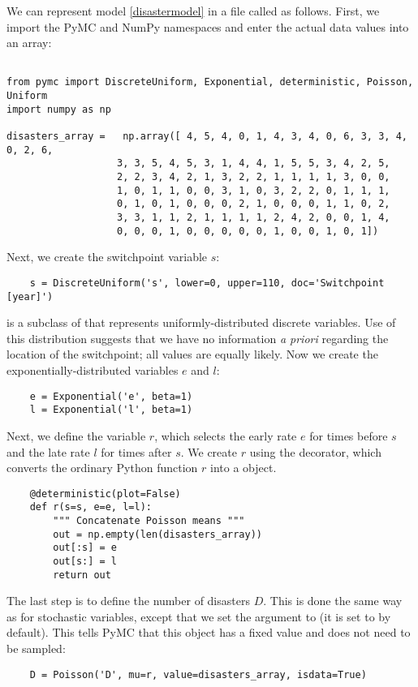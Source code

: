 We can represent model \ref{disastermodel} in a file called  as follows. First, we import the PyMC and NumPy namespaces and enter the actual data values into an array:
\begin{verbatim}
	
from pymc import DiscreteUniform, Exponential, deterministic, Poisson, Uniform
import numpy as np

disasters_array =   np.array([ 4, 5, 4, 0, 1, 4, 3, 4, 0, 6, 3, 3, 4, 0, 2, 6,
                   3, 3, 5, 4, 5, 3, 1, 4, 4, 1, 5, 5, 3, 4, 2, 5,
                   2, 2, 3, 4, 2, 1, 3, 2, 2, 1, 1, 1, 1, 3, 0, 0,
                   1, 0, 1, 1, 0, 0, 3, 1, 0, 3, 2, 2, 0, 1, 1, 1,
                   0, 1, 0, 1, 0, 0, 0, 2, 1, 0, 0, 0, 1, 1, 0, 2,
                   3, 3, 1, 1, 2, 1, 1, 1, 1, 2, 4, 2, 0, 0, 1, 4,
                   0, 0, 0, 1, 0, 0, 0, 0, 0, 1, 0, 0, 1, 0, 1])
\end{verbatim} 
Next, we create the switchpoint variable $s$:
\begin{verbatim}
	s = DiscreteUniform('s', lower=0, upper=110, doc='Switchpoint
[year]')  
\end{verbatim}
 is a subclass of  that represents uniformly-distributed discrete variables. Use of this distribution suggests that we have no information \emph{a priori} regarding the location of the switchpoint; all values are equally likely. Now we create the exponentially-distributed variables $e$ and $l$:
\begin{verbatim}
   	e = Exponential('e', beta=1)
	l = Exponential('l', beta=1)   
\end{verbatim}
Next, we define the variable $r$, which selects the early rate $e$ for times before $s$ and the late rate $l$ for times after $s$. We create $r$ using the  decorator, which converts the ordinary Python function $r$ into a  object.
\begin{verbatim}
	@deterministic(plot=False)
	def r(s=s, e=e, l=l):
		""" Concatenate Poisson means """
	    out = np.empty(len(disasters_array))
	    out[:s] = e
	    out[s:] = l
	    return out
\end{verbatim}
The last step is to define the number of disasters $D$. This is done the same way as for stochastic variables, except that we set the argument  to  (it is set to  by default). This tells PyMC that this object has a fixed value and does not need to be sampled:
\begin{verbatim}
	D = Poisson('D', mu=r, value=disasters_array, isdata=True)
\end{verbatim}

